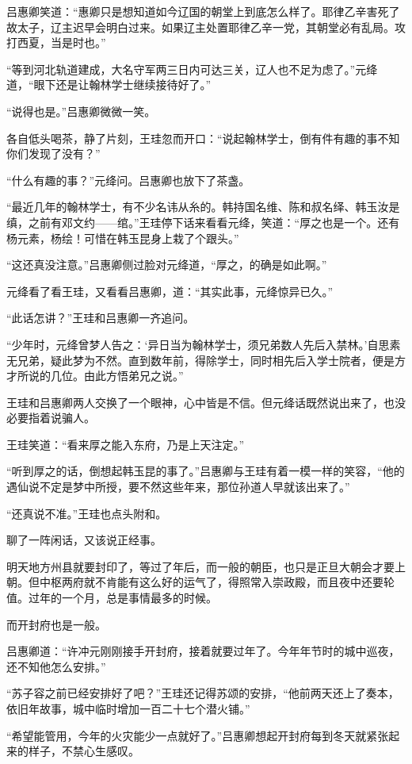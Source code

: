 吕惠卿笑道：“惠卿只是想知道如今辽国的朝堂上到底怎么样了。耶律乙辛害死了故太子，辽主迟早会明白过来。如果辽主处置耶律乙辛一党，其朝堂必有乱局。攻打西夏，当是时也。”

“等到河北轨道建成，大名守军两三日内可达三关，辽人也不足为虑了。”元绛道，“眼下还是让翰林学士继续接待好了。”

“说得也是。”吕惠卿微微一笑。

各自低头喝茶，静了片刻，王珪忽而开口：“说起翰林学士，倒有件有趣的事不知你们发现了没有？”

“什么有趣的事？”元绛问。吕惠卿也放下了茶盏。

“最近几年的翰林学士，有不少名讳从糸的。韩持国名维、陈和叔名绎、韩玉汝是缜，之前有邓文约——绾。”王珪停下话来看看元绛，笑道：“厚之也是一个。还有杨元素，杨绘！可惜在韩玉昆身上栽了个跟头。”

“这还真没注意。”吕惠卿侧过脸对元绛道，“厚之，的确是如此啊。”

元绛看了看王珪，又看看吕惠卿，道：“其实此事，元绛惊异已久。”

“此话怎讲？”王珪和吕惠卿一齐追问。

“少年时，元绛曾梦人告之：‘异日当为翰林学士，须兄弟数人先后入禁林。’自思素无兄弟，疑此梦为不然。直到数年前，得除学士，同时相先后入学士院者，便是方才所说的几位。由此方悟弟兄之说。”

王珪和吕惠卿两人交换了一个眼神，心中皆是不信。但元绛话既然说出来了，也没必要指着说骗人。

王珪笑道：“看来厚之能入东府，乃是上天注定。”

“听到厚之的话，倒想起韩玉昆的事了。”吕惠卿与王珪有着一模一样的笑容，“他的遇仙说不定是梦中所授，要不然这些年来，那位孙道人早就该出来了。”

“还真说不准。”王珪也点头附和。

聊了一阵闲话，又该说正经事。

明天地方州县就要封印了，等过了年后，而一般的朝臣，也只是正旦大朝会才要上朝。但中枢两府就不肯能有这么好的运气了，得照常入崇政殿，而且夜中还要轮值。过年的一个月，总是事情最多的时候。

而开封府也是一般。

吕惠卿道：“许冲元刚刚接手开封府，接着就要过年了。今年年节时的城中巡夜，还不知他怎么安排。”

“苏子容之前已经安排好了吧？”王珪还记得苏颂的安排，“他前两天还上了奏本，依旧年故事，城中临时增加一百二十七个潜火铺。”

“希望能管用，今年的火灾能少一点就好了。”吕惠卿想起开封府每到冬天就紧张起来的样子，不禁心生感叹。


